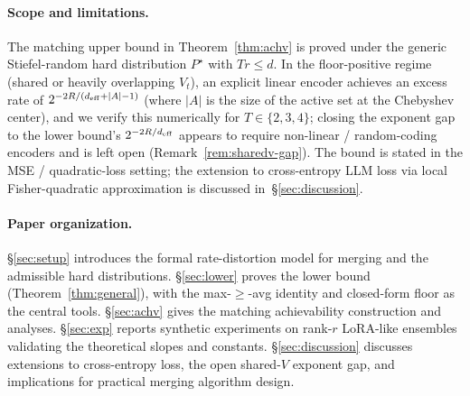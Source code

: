 \paragraph{Scope and limitations.} The matching upper bound
in Theorem~\ref{thm:achv} is proved under the generic
Stiefel-random hard distribution $P^\star$ with $Tr\leq d$.
In the floor-positive regime (shared or heavily overlapping
$V_t$), an explicit linear encoder achieves an excess rate of
$2^{-2R/(d_{\mathrm{eff}}+|A|-1)}$ (where $|A|$ is the size of the
active set at the Chebyshev center), and we verify this
numerically for $T\in\{2,3,4\}$; closing the exponent gap to
the lower bound's $2^{-2R/d_{\mathrm{eff}}}$ appears to require
non-linear / random-coding encoders and is left open
(Remark~\ref{rem:sharedv-gap}). The bound is stated in the
MSE / quadratic-loss setting; the extension to cross-entropy
LLM loss via local Fisher-quadratic approximation is
discussed in~\S\ref{sec:discussion}.

\paragraph{Paper organization.}
\S\ref{sec:setup} introduces the formal rate-distortion model
for merging and the admissible hard distributions.
\S\ref{sec:lower} proves the lower bound
(Theorem~\ref{thm:general}), with the
max-$\geq$-avg identity and closed-form floor as the central
tools. \S\ref{sec:achv} gives the matching achievability
construction and analyses. \S\ref{sec:exp} reports synthetic
experiments on rank-$r$ LoRA-like ensembles validating the
theoretical slopes and constants. \S\ref{sec:discussion}
discusses extensions to cross-entropy loss, the open
shared-$V$ exponent gap, and implications for practical
merging algorithm design.
